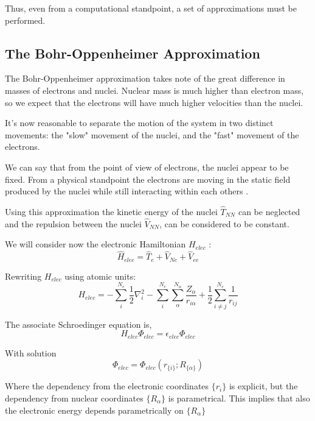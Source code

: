 \documentclass[a4paper,12pt]{article}
\begin{document}
Thus, even from a computational standpoint, a set of approximations must be performed.


\subsection{The Bohr-Oppenheimer Approximation}

The Bohr-Oppenheimer approximation takes note of the great difference in masses of electrons and nuclei.
Nuclear mass is much higher than electron mass, so we expect that the electrons will have much higher velocities than the nuclei. 

It's now reasonable to separate the motion of the system in two distinct movements: the "slow" movement of the nuclei, and the "fast" movement of the electrons.

We can say that from the point of view of electrons, the nuclei appear to be fixed. 
From a physical standpoint the electrons are moving in the static field produced by the nuclei while still interacting within each others \cite[p.241]{Atkins97}.


Using this approximation the kinetic energy of the nuclei $\hat{T}_{NN}$ can be neglected and the repulsion between the nuclei $\hat{V}_{NN}$, can be considered to be constant.

We will consider now the electronic Hamiltonian $H_{elec}$ :
\begin{equation}
	\hat{H}_{elec} = \hat{T}_{e} + \hat{V}_{Ne} + \hat{V}_{ee}
\end{equation}

Rewriting $H_{elec}$  using atomic units:
\begin{equation}\label{eq:H_elec}
	H_{elec} = - \sum_{i}^{N_{e}} \frac{1}{2} \nabla_{i}^2  - \sum_{i}^{N_{e}} \sum_{\alpha}^{N_{\alpha}} \frac{Z_{\alpha}}{r_{i\alpha}}  + \frac{1}{2} \sum_{i \neq j}^{N_{e}} \frac{1}{r_{ij}}
\end{equation}

The associate Schroedinger equation is,
\begin{equation}
	H_{elec} \Phi_{elec} = \epsilon_{elec} \Phi_{elec}
\end{equation}

With solution
\begin{equation}
	\Phi_{elec} = \Phi_{elec}(r_{\{i\}};R_{\{\alpha\}})
\end{equation}

Where the dependency from the electronic coordinates $\{r_i\}$ is explicit, but the dependency from nuclear coordinates $\{R_{\alpha}\}$ is parametrical.
This implies that also the electronic energy depends parametrically on $\{R_{\alpha}\}$
\end{document}
